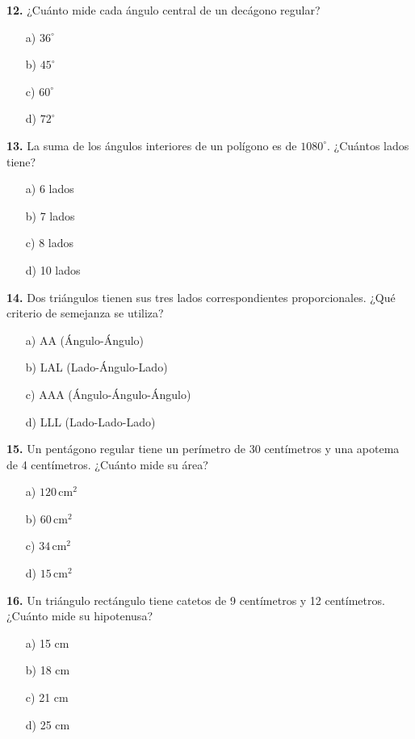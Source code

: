 \noindent\textbf{12.} ¿Cuánto mide cada ángulo central de un decágono regular?

\begin{itemize}
    \item[a)] $36^\circ$
    \item[b)] $45^\circ$
    \item[c)] $60^\circ$
    \item[d)] $72^\circ$
\end{itemize}


\noindent\textbf{13.} La suma de los ángulos interiores de un polígono es de $1080^\circ$. ¿Cuántos lados tiene?

\begin{itemize}
    \item[a)] 6 lados
    \item[b)] 7 lados
    \item[c)] 8 lados
    \item[d)] 10 lados
\end{itemize}


\noindent\textbf{14.} Dos triángulos tienen sus tres lados correspondientes proporcionales. ¿Qué criterio de semejanza se utiliza?

\begin{itemize}
    \item[a)] AA (Ángulo-Ángulo)
    \item[b)] LAL (Lado-Ángulo-Lado)
    \item[c)] AAA (Ángulo-Ángulo-Ángulo)
    \item[d)] LLL (Lado-Lado-Lado)
\end{itemize}


\noindent\textbf{15.} Un pentágono regular tiene un perímetro de 30 centímetros y una apotema de 4 centímetros. ¿Cuánto mide su área?

\begin{itemize}
    \item[a)] $120\,\text{cm}^2$
    \item[b)] $60\,\text{cm}^2$
    \item[c)] $34\,\text{cm}^2$
    \item[d)] $15\,\text{cm}^2$
\end{itemize}


\noindent\textbf{16.} Un triángulo rectángulo tiene catetos de 9 centímetros y 12 centímetros. ¿Cuánto mide su hipotenusa?

\begin{itemize}
    \item[a)] 15 cm
    \item[b)] 18 cm
    \item[c)] 21 cm
    \item[d)] 25 cm
\end{itemize}


